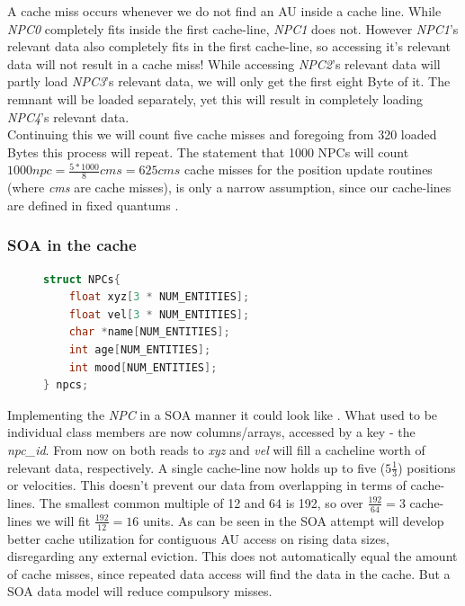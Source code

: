 A cache miss occurs whenever we do not find an AU inside a cache line. While \textit{NPC0} completely fits inside the first cache-line, \textit{NPC1} does not. However \textit{NPC1}'s relevant data also completely fits in the first cache-line, so accessing it's relevant data will not result in a cache miss! While accessing \textit{NPC2}'s relevant data will partly load \textit{NPC3}'s relevant data, we will only get the first eight Byte of it. The remnant will be loaded separately, yet this will result in completely loading \textit{NPC4}'s relevant data.\\
Continuing this we will count five cache misses and foregoing from 320 loaded Bytes this process will repeat. The statement that 1000 NPCs will count $1000 npc = \frac{5 * 1000}{8} cms = 625 cms
$ cache misses for the position update routines (where \textit{cms} are cache misses), is only a narrow assumption, since our cache-lines are defined in fixed quantums .
\subsubsection{SOA in the cache}
\begin{figure}
\begin{lstlisting}[language=C++,numbers=none,name={SOA variant of the NPC},label={soa_npc}]
struct NPCs{
	float xyz[3 * NUM_ENTITIES];
	float vel[3 * NUM_ENTITIES];
	char *name[NUM_ENTITIES];
	int age[NUM_ENTITIES];
	int mood[NUM_ENTITIES];
} npcs;
\end{lstlisting}
\end{figure}
Implementing the \textit{NPC} in a SOA manner it could look like . What used to be individual class members are now columns/arrays, accessed by a key - the \textit{npc\_id}. From now on both reads to \textit{xyz} and \textit{vel} will fill a cacheline worth of relevant data, respectively. A single cache-line now holds up to five ($5\frac{1}{3}$) positions or velocities. This doesn't prevent our data from overlapping in terms of cache-lines. The smallest common multiple of 12 and 64 is 192, so over $\frac{192}{64}=3$ cache-lines we will fit $\frac{192}{12}=16$ units. As can be seen in  the SOA attempt will develop better cache utilization for contiguous AU access on rising data sizes, disregarding any external eviction. This does not automatically equal the amount of cache misses, since repeated data access will find the data in the cache. But a SOA data model will reduce compulsory misses.
